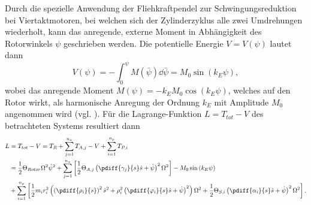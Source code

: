 %
%
%
%
%
%
%
%
%
%
%
Durch die spezielle Anwendung der Fliehkraftpendel zur Schwingungsreduktion bei Viertaktmotoren, bei welchen 
sich der Zylinderzyklus alle zwei Umdrehungen wiederholt, kann das anregende, externe Moment in Abhängigkeit
des Rotorwinkels $\psi$ geschrieben werden. Die potentielle Energie $V = V(\psi)$ lautet dann
\begin{equation}
		V\left(\psi\right) = - \int^{\psi}_{0} {M\left(\bar{\psi}\right) \dd \bar{\psi}} = M_0 \sin \left(k_E \psi\right) ,
\label{eq:PotentialDesAnregendenMoments}
\end{equation}
wobei das anregende Moment $M\left(\psi\right) = -k_E M_0 \cos \left(k_E \psi\right)$, welches auf den Rotor wirkt, 
als harmonische Anregung der Ordnung $k_E$ mit Amplitude $M_0$ angenommen wird (vgl. ).
%
%
Für die Lagrange-Funktion $L = T_{tot} - V$ des betrachteten Systems resultiert dann
\begin{equation}
\begin{split} 
	L & = T_{tot} - V = T_R  + \sum_{j=1}^{n_a} T_{A,j} - V  + \sum_{i=1}^{n_p} T_{P,i} \\
		& = \frac{1}{2}\Theta_{Rotor} \Omega^2 \dot{\psi}^2 + \sum_{j=1}^{n_a} \left[\frac{1}{2} \Theta_{A,j} \left( \pdiff{\gamma_j}{s}\dot{s} + \dot{\psi} \right)^2 \Omega^2\right] - M_0 \sin \left(k_E \psi\right) \\
		& + \sum_{i=1}^{n_p} \left[\frac{1}{2} m_i r_i^2 \left( \left(\pdiff{\rho_i}{s}\right)^2 \dot{s}^2 + \rho_i^2 \left(\pdiff{\varphi_i}{s}\dot{s}+\dot{\psi}\right)^2 \right) \Omega^2 + \frac{1}{2} \Theta_{S,i} \left( \pdiff{\alpha_i}{s}\dot{s} + \dot{\psi} \right)^2 \Omega^2\right].   \end{split}
	\label{eq:LagrangeFunktionInRealenKoordinaten}
\end{equation}
